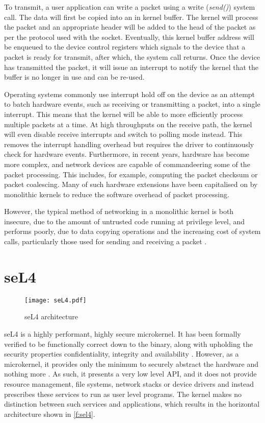 To transmit, a user application can write a packet using a write (\emph{send()}) system call. 
The data will first be copied into an in kernel buffer. The kernel will process 
the packet and an appropriate header will be added to the head of the packet as per the protocol used 
with the socket. Eventually, this kernel buffer address will be enqueued to the device control
registers which signals to the device that a packet is ready for transmit, after which, the system call
returns. Once the device has transmitted the packet, it will issue an interrupt to notify the kernel
that the buffer is no longer in use and can be re-used.

Operating systems commonly use interrupt hold off on the device as an attempt to batch hardware
events, such as receiving or transmitting a packet, into a single interrupt. This means that the kernel
will be able to more efficiently process multiple packets at a time. At high throughputs on the receive
path, the kernel will even disable receive interrupts and switch to polling mode instead. This removes
the interrupt handling overhead but requires the driver to continuously check for hardware events.
Furthermore, in recent years, hardware has become more complex, and network devices are capable of 
commandeering some of the packet processing. This includes, for example, computing the packet
checksum or packet coalescing. Many of such hardware extensions have been capitalised on by monolithic
kernels to reduce the software overhead of packet processing.


However, the typical method of networking in a monolithic kernel is both insecure, due to the amount 
of untrusted code running at privilege level, and performs poorly, due to data copying operations and 
the increasing cost of system calls, particularly
those used for sending and receiving a packet \cite{Ren_RCVSY_19}.

\section{seL4}
\begin{figure}[h]
    \centering
    \texttt{[image: seL4.pdf]}
    \caption{seL4 architecture}
    \label{f:sel4}
\end{figure}

seL4 is a highly performant, highly secure microkernel. It has been formally verified to be
functionally correct down to the binary, along with upholding the security properties confidentiality, 
integrity and availability \cite{Klein_AEMSKH_14}. However, as a microkernel, it provides only the minimum
to securely abstract the hardware and nothing more \cite{Heiser_PCVL_22}. As such, 
it presents a very low level API, and it does not provide resource management, file systems, network stacks
or device drivers and instead prescribes these services to run as user level programs. 
The kernel makes no distinction between such services and applications, which results in the horizontal
architecture shown in \autoref{f:sel4}. 

